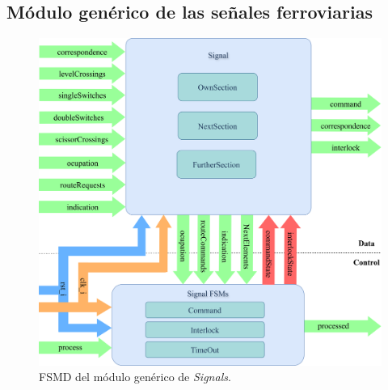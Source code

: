 \subsection{Módulo genérico de las señales ferroviarias}

\lipsum[1]

\begin{figure}[H]
	\centering
	\includegraphics[width=1\textwidth]{Figuras/SIG_module}
	\centering\caption{FSMD del módulo genérico de \textit{Signals}.}
	\label{fig:SIG_module}
\end{figure}

\lipsum[1]